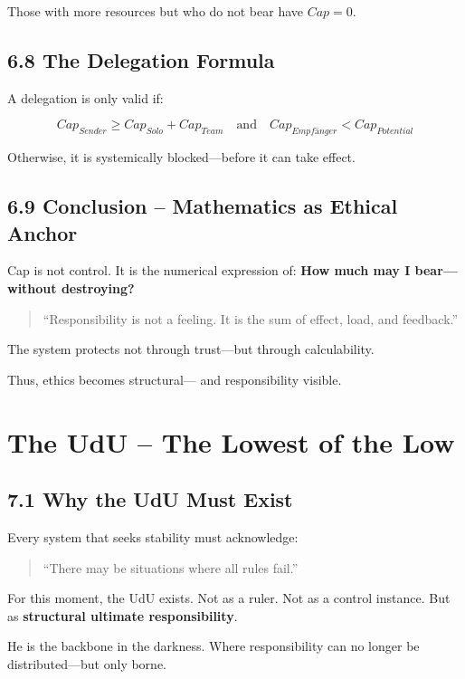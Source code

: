 \documentclass[12pt,a4paper]{book}
\begin{document}
Those with more resources but who do not bear have $Cap = 0$.

\section*{6.8 The Delegation Formula}

A delegation is only valid if:

\[
Cap_{Sender} \geq Cap_{Solo} + Cap_{Team} \quad \text{and} \quad Cap_{Empfänger} < Cap_{Potential}
\]

Otherwise, it is systemically blocked—before it can take effect.

\section*{6.9 Conclusion – Mathematics as Ethical Anchor}

Cap is not control.  
It is the numerical expression of: \textbf{How much may I bear—without destroying?}

\begin{quote}
“Responsibility is not a feeling.  
It is the sum of effect, load, and feedback.”  
\end{quote}

The system protects not through trust—but through calculability.

Thus, ethics becomes structural—  
and responsibility visible.

\chapter{The UdU – The Lowest of the Low}

\section*{7.1 Why the UdU Must Exist}

Every system that seeks stability must acknowledge:

\begin{quote}
“There may be situations where all rules fail.”  
\end{quote}

For this moment, the UdU exists.  
Not as a ruler. Not as a control instance.  
But as \textbf{structural ultimate responsibility}.

He is the backbone in the darkness.  
Where responsibility can no longer be distributed—but only borne.
\end{document}
